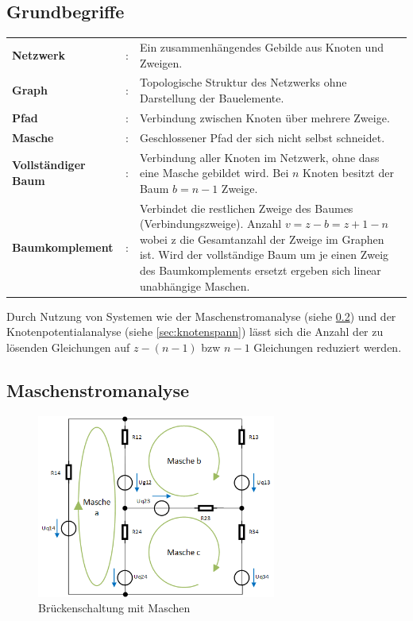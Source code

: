 \documentclass[12pt,a4paper]{article}%
\numberwithin{equation}{section}
\numberwithin{equation}{subsection}
\begin{document}
  \subsection{Grundbegriffe}
  \begin{tabularx}{14.7cm}{l l X}
    \textbf{Netzwerk}&: &Ein zusammenhängendes Gebilde aus Knoten und Zweigen. \\
    \textbf{Graph}&: &Topologische Struktur des Netzwerks ohne Darstellung der Bauelemente.\\
    \textbf{Pfad}&: &Verbindung zwischen Knoten über mehrere Zweige.\\
    \textbf{Masche}&: &Geschlossener Pfad der sich nicht selbst schneidet.\\
    \textbf{Vollständiger Baum}&: &Verbindung aller Knoten im Netzwerk, ohne dass eine Masche gebildet wird. Bei $n$ Knoten besitzt der Baum $b = n-1$ Zweige.\\
    \textbf{Baumkomplement}&: &Verbindet die restlichen Zweige des Baumes (Verbindungszweige). Anzahl $v = z-b = z+1-n$ wobei z die Gesamtanzahl der Zweige im Graphen ist. Wird der vollständige Baum um je einen Zweig des Baumkomplements ersetzt ergeben sich linear unabhängige Maschen.\\
  \end{tabularx}  
  \newline
  \newline
  Durch Nutzung von Systemen wie der Maschenstromanalyse (siehe \ref{sec:maschenstr}) und der Knotenpotentialanalyse (siehe \ref{sec:knotenspann}) lässt sich die Anzahl der zu lösenden Gleichungen auf $z-(n-1)$ bzw $n-1$ Gleichungen reduziert werden.
  \subsection{Maschenstromanalyse} \label{sec:maschenstr}
  \begin{figure}[htbp] 
  \centering
  \includegraphics[width=0.7\textwidth]{Bruckenschaltung_mit_Maschen.png}
  \caption{Brückenschaltung mit Maschen}
  \label{fig:brueckenschaltung_maschen}
\end{figure}
\end{document}
